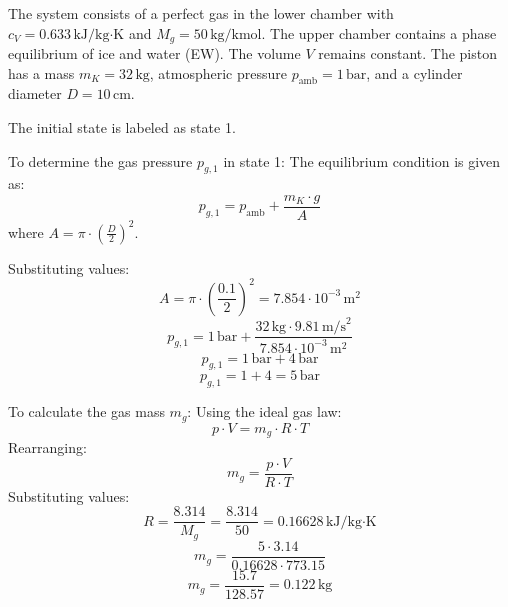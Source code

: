 The system consists of a perfect gas in the lower chamber with \( c_V = 0.633 \, \text{kJ/kg·K} \) and \( M_g = 50 \, \text{kg/kmol} \). The upper chamber contains a phase equilibrium of ice and water (EW). The volume \( V \) remains constant. The piston has a mass \( m_K = 32 \, \text{kg} \), atmospheric pressure \( p_{\text{amb}} = 1 \, \text{bar} \), and a cylinder diameter \( D = 10 \, \text{cm} \).  

The initial state is labeled as state 1.  

To determine the gas pressure \( p_{g,1} \) in state 1:  
The equilibrium condition is given as:  
\[
p_{g,1} = p_{\text{amb}} + \frac{m_K \cdot g}{A}
\]  
where \( A = \pi \cdot \left(\frac{D}{2}\right)^2 \).  

Substituting values:  
\[
A = \pi \cdot \left(\frac{0.1}{2}\right)^2 = 7.854 \cdot 10^{-3} \, \text{m}^2
\]  
\[
p_{g,1} = 1 \, \text{bar} + \frac{32 \, \text{kg} \cdot 9.81 \, \text{m/s}^2}{7.854 \cdot 10^{-3} \, \text{m}^2}
\]  
\[
p_{g,1} = 1 \, \text{bar} + 4 \, \text{bar}
\]  
\[
p_{g,1} = 1 + 4 = 5 \, \text{bar}
\]  

To calculate the gas mass \( m_g \):  
Using the ideal gas law:  
\[
p \cdot V = m_g \cdot R \cdot T
\]  
Rearranging:  
\[
m_g = \frac{p \cdot V}{R \cdot T}
\]  
Substituting values:  
\[
R = \frac{8.314}{M_g} = \frac{8.314}{50} = 0.16628 \, \text{kJ/kg·K}
\]  
\[
m_g = \frac{5 \cdot 3.14}{0.16628 \cdot 773.15}
\]  
\[
m_g = \frac{15.7}{128.57} = 0.122 \, \text{kg}
\]